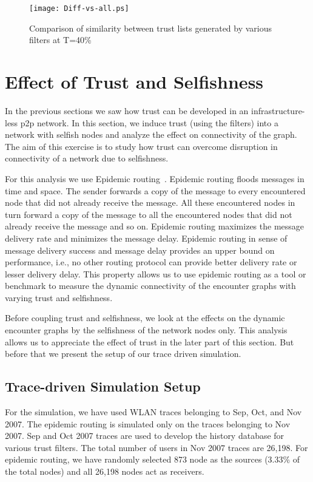 \documentclass[10pt,conference]{IEEEtran}
\begin{document}
\begin{figure}
\centering

\texttt{[image: Diff-vs-all.ps]} 
\caption{Comparison of similarity between trust lists generated by various filters at T=40\%}
\label{fig:correlate}
\end{figure}




\section{Effect of Trust and Selfishness} \label{epidemic}



In the previous sections we saw how trust can be developed in an infrastructure-less p2p network. In this section, we induce trust (using the filters) into a network with selfish nodes and analyze the effect on connectivity of the graph. The aim of this exercise is to study how trust can overcome disruption in connectivity of a network due to selfishness.

For this analysis we use Epidemic routing~\cite{epidemic}. Epidemic routing floods messages in time and space. The sender forwards a copy of the message to every encountered node that did not already receive the message. All these encountered nodes in turn forward a copy of the message to all the encountered nodes that did not already receive the message and so on.  Epidemic routing maximizes the message delivery rate and minimizes the message delay.  Epidemic routing in sense of message delivery success and message delay provides an upper bound on performance, i.e., no other routing protocol can provide better delivery rate or lesser delivery delay. This property allows us to use epidemic routing as a tool or benchmark to measure the dynamic connectivity of the encounter graphs with varying trust and selfishness.

Before coupling trust and selfishness, we look at the effects on the dynamic encounter graphs by the selfishness of the network nodes only. This analysis allows us to appreciate the effect of trust in the later part of this section. But before that we present the setup of our trace driven simulation.

\subsection{Trace-driven Simulation Setup}

For the simulation, we have used WLAN traces belonging to Sep, Oct, and Nov 2007. The epidemic routing is simulated only on the traces belonging to Nov 2007. Sep and Oct 2007 traces are used to develop the history database for various trust filters. The total number of users in Nov 2007 traces are 26,198. For epidemic routing, we have randomly selected 873 node as the sources (3.33\% of the total nodes) and all 26,198 nodes act as receivers. 
\end{document}
